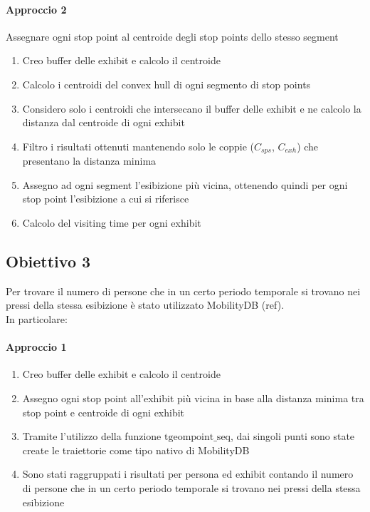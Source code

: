 \documentclass[12pt]{article}
\begin{document}
\paragraph{Approccio 2} Assegnare ogni stop point al centroide degli stop points dello stesso segment
\begin{enumerate}
    \item Creo buffer delle exhibit e calcolo il centroide
    \item Calcolo i centroidi del convex hull di ogni segmento di stop points
    \item Considero solo i centroidi che intersecano il buffer delle exhibit e ne calcolo la distanza dal centroide di ogni exhibit
    \item Filtro i risultati ottenuti mantenendo solo le coppie ($C_{sps}$, $C_{exh}$) che presentano la distanza minima
    \item Assegno ad ogni segment l'esibizione più vicina, ottenendo quindi per ogni stop point l'esibizione a cui si riferisce
    \item Calcolo del visiting time per ogni exhibit
\end{enumerate}
\subsection{Obiettivo 3}
Per trovare il numero di persone che in un certo periodo temporale si trovano nei pressi della stessa esibizione è stato utilizzato MobilityDB (ref).\\
In particolare:
\paragraph{Approccio 1}
\begin{enumerate}
    \item Creo buffer delle exhibit e calcolo il centroide
    \item Assegno ogni stop point all'exhibit più vicina in base alla distanza minima tra stop point e centroide di ogni exhibit
    \item Tramite l'utilizzo della funzione $\text{tgeompoint\_seq}$, dai singoli punti sono state create le traiettorie come tipo nativo di MobilityDB
    \item Sono stati raggruppati i risultati per persona ed exhibit contando il numero di persone che in un certo periodo temporale si trovano nei pressi della stessa esibizione
\end{enumerate}
\end{document}

